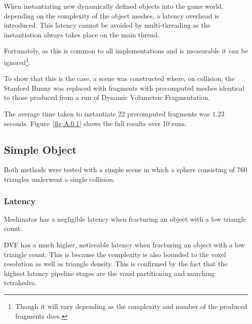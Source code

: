 When instantiating new dynamically defined objects into the game world, depending on the complexity of the object meshes, a latency overhead is introduced. This latency cannot be avoided by multi-threading as the instantiation always takes place on the main thread.

Fortunately, as this is common to all implementations and is measurable it can be ignored\footnote{Though it will vary depending as the complexity and number of the produced fragments does.}.

To show that this is the case, a scene was constructed where, on collision, the Stanford Bunny was replaced with fragments with precomputed meshes identical to those produced from a run of Dynamic Volumetric Fragmentation.

The average time taken to instantiate 22 precomputed fragments was $1.23$ seconds. Figure~\ref{fig:A.0.1} shows the full results over 10 runs.

\clearpage
\subsection{Simple Object}

Both methods were tested with a simple scene in which a sphere consisting of 760 triangles underwent a single collision.

\FloatBarrier

\subsubsection{Latency}

Meshinator has a negligible latency when fracturing an object with a low triangle count.

DVF has a much higher, noticeable latency when fracturing an object with a low triangle count. This is because the complexity is also bounded to the voxel resolution as well as triangle density. This is confirmed by the fact that the highest latency pipeline stages are the voxel partitioning and marching tetrahedra.

